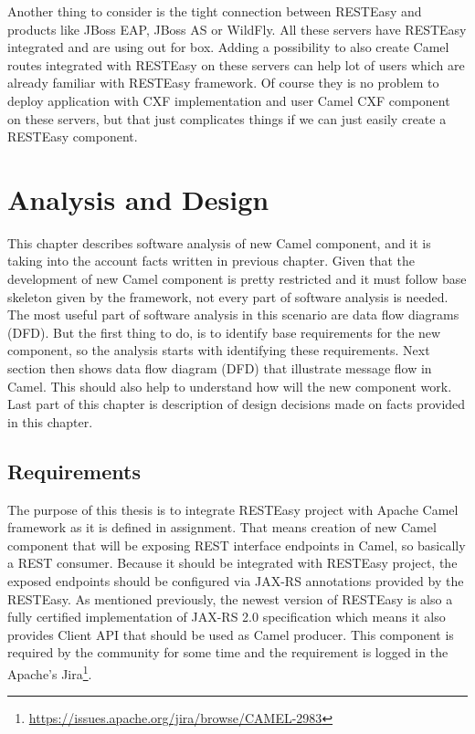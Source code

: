 \documentclass[12pt,final,oneside]{fithesis2}
\begin{document}
Another thing to consider is the tight connection between RESTEasy and products like JBoss EAP, JBoss AS or WildFly. All these servers have RESTEasy integrated and are using out for box. Adding a possibility to also create Camel routes integrated with RESTEasy on these servers can help lot of users which are already familiar with RESTEasy framework. Of course they is no problem to deploy application with CXF implementation and user Camel CXF component on these servers, but that just complicates things if we can just easily create a RESTEasy component. 

%
\chapter{Analysis and Design}
This chapter describes software analysis of new Camel component, and it is taking into the account facts written in previous chapter. Given that the development of new Camel component is pretty restricted and it must follow base skeleton given by the framework, not every part of software analysis is needed. The most useful part of software analysis in this scenario are data flow diagrams (DFD). But the first thing to do, is to identify base requirements for the new component, so the analysis starts with identifying these requirements. Next section then shows data flow diagram (DFD) that illustrate message flow in Camel. This should also help to understand how will the new component work. Last part of this chapter is description of design decisions made on facts provided in this chapter. 

\section{Requirements}
The purpose of this thesis is to integrate RESTEasy project with Apache Camel framework as it is defined in assignment. That means creation of new Camel component that will be exposing REST interface endpoints in Camel, so basically a REST consumer. Because it should be integrated with RESTEasy project, the exposed endpoints should be configured via JAX-RS annotations provided by  the RESTEasy. As mentioned previously, the newest version of RESTEasy is also a fully certified implementation of JAX-RS 2.0 specification which means it also provides Client API that should be used as Camel producer. This component is required by the community for some time and the requirement is logged in  
the Apache's Jira\footnote{\url{https://issues.apache.org/jira/browse/CAMEL-2983}}.
\end{document}
